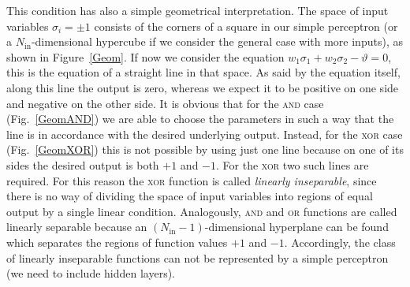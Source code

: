 This condition has also a simple geometrical interpretation. The space of input variables $\sigma_i=\pm1$ consists of the corners of a square in our simple perceptron (or a $N_{\text{in}}$-dimensional hypercube if we consider the general case with more inputs), as shown in Figure~\ref{Geom}. If now we consider the equation $w_1\sigma_1+w_2\sigma_2-\vartheta=0$, this is the equation of a straight line in that space. As said by the equation itself, along this line the output is zero, whereas we expect it to be positive on one side and negative on the other side. It is obvious that for the \textsc{and} case (Fig.~\ref{GeomAND}) we are able to choose the parameters in such a way that the line is in accordance with the desired underlying output. Instead, for the \textsc{xor} case (Fig.~\ref{GeomXOR}) this is not possible by using just one line because on one of its sides the desired output is both $+1$ and $-1$. For the \textsc{xor} two such lines are required. For this reason the \textsc{xor} function is called \emph{linearly inseparable}, since there is no way of dividing the space of input variables into regions of equal output by a single linear condition. Analogously, \textsc{and} and \textsc{or} functions are called linearly separable because an $(N_{\text{in}}-1)$-dimensional hyperplane can be found which separates the regions of function values $+1$ and $-1$. Accordingly, the class of linearly inseparable functions can not be represented by a simple perceptron (we need to include hidden layers).
